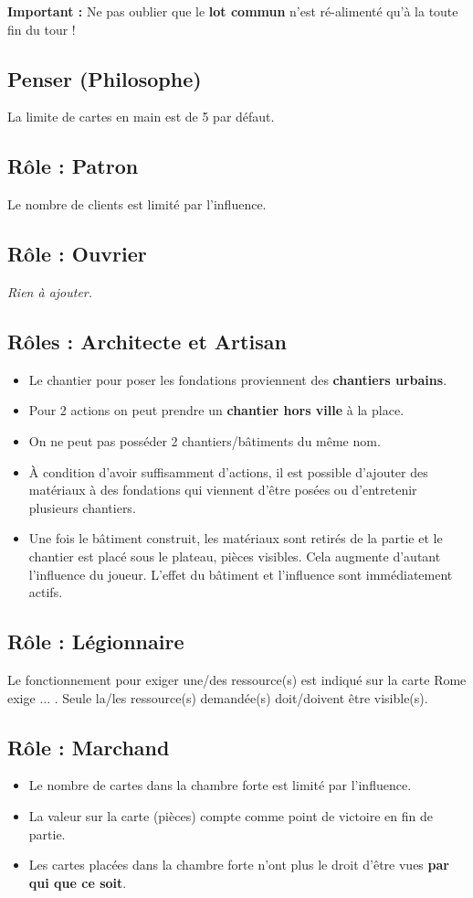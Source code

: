 \documentclass[10pt, a4paper]{article}	%
\begin{document}
\begin{multicols}{3}
\textbf{Important :} Ne pas oublier que le \textbf{lot commun} n'est ré-alimenté qu'à la toute fin du tour !

\subsection{Penser (Philosophe)}
La limite de cartes en main est de 5 par défaut.

\subsection{Rôle : Patron}
Le nombre de clients est limité par l'influence.

\subsection{Rôle : Ouvrier}
\textit{Rien à ajouter.}

\subsection{Rôles : Architecte et Artisan}
\begin{itemize}
\item Le chantier pour poser les fondations proviennent des \textbf{chantiers urbains}.
\item Pour 2 actions on peut prendre un \textbf{chantier hors ville} à la place.
\item On ne peut pas posséder 2 chantiers/bâtiments du même nom.
\item À condition d'avoir suffisamment d'actions, il est possible d'ajouter des matériaux à des fondations qui viennent d'être posées ou d'entretenir plusieurs chantiers.
\item Une fois le bâtiment construit, les matériaux sont retirés de la partie et le chantier est placé sous le plateau, pièces visibles. Cela augmente d'autant l'influence du joueur. L'effet du bâtiment et l'influence sont immédiatement actifs.
\end{itemize}

\subsection{Rôle : Légionnaire}
Le fonctionnement pour exiger une/des ressource(s) est indiqué sur la carte \og Rome exige ... \fg{}. Seule la/les ressource(s) demandée(s) doit/doivent être visible(s).

\subsection{Rôle : Marchand}
\begin{itemize}
\item Le nombre de cartes dans la chambre forte est limité par l'influence.
\item La valeur sur la carte (pièces) compte comme point de victoire en fin de partie.
\item Les cartes placées dans la chambre forte n'ont plus le droit d'être vues \textbf{par qui que ce soit}.
\end{itemize}





\end{multicols}
\end{document}
